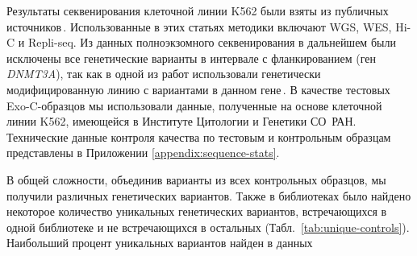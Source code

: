 \documentclass[a4paper,14pt]{extarticle}
\newcommand{\genename}[1]{\textit{#1}}
\newcommand{\ecitep}[1]{\textenglish{\citep{#1}}}
\newcommand{\tableref}[1]{Табл.~\ref{#1}}
\begin{document}
Результаты секвенирования клеточной линии K562 были взяты из публичных источников\,\ecitep{Banaszak_2018,Belaghzal_2017,Dixon_2018,Moquin_2017,Rao_2014,Ray_2019,Wang_2020,Zhou_2019}.
Использованные в этих статьях методики включают WGS, WES, Hi-C и Repli-seq.
Из данных полноэкзомного секвенирования в дальнейшем были исключены все генетические варианты в интервале  с фланкированием  (ген \genename{DNMT3A}), так как в одной из работ использовали генетически модифицированную линию с вариантами в данном гене\,\ecitep{Banaszak_2018}.
В качестве тестовых Exo-C-образцов мы использовали данные, полученные на основе клеточной линии K562, имеющейся в Институте Цитологии и Генетики СО~РАН.
Технические данные контроля качества по тестовым и контрольным образцам представлены в Приложении \ref{appendix:sequence-stats}.

В общей сложности, объединив варианты из всех контрольных образцов, мы получили  различных генетических вариантов.
Также в библиотеках было найдено некоторое количество уникальных генетических вариантов, встречающихся в одной библиотеке и не встречающихся в остальных (\tableref{tab:unique-controls}).
Наибольший процент уникальных вариантов найден в данных \citeauthor{Banaszak_2018}
\end{document}
